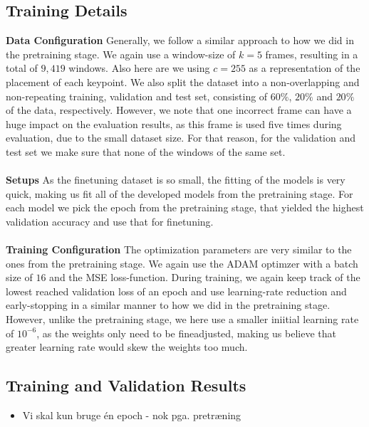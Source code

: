\documentclass[./main.tex]{subfiles}
\begin{document}
\subsection{Training Details}
\textbf{Data Configuration} Generally, we follow a similar approach to how we did in the pretraining stage. We again use a window-size of $k = 5$ frames, resulting in a total of $9,419$ windows. Also here are we using $c = 255$ as a representation of the placement of each keypoint. We also split the dataset into a non-overlapping and non-repeating training, validation and test set, consisting of $60\%$, $20\%$ and $20\%$ of the data, respectively. However, we note that one incorrect frame can have a huge impact on the evaluation results, as this frame is used five times during evaluation, due to the small dataset size. For that reason, for the validation and test set we make sure that none of the windows of the same set.
\\
\\
\textbf{Setups} As the finetuning dataset is so small, the fitting of the models is very quick, making us fit all of the developed models from the pretraining stage. For each model we pick the epoch from the pretraining stage, that yielded the highest validation accuracy and use that for finetuning.
\\
\\
\textbf{Training Configuration} The optimization parameters are very similar to the ones from the pretraining stage. We again use the ADAM optimzer with a batch size of $16$ and the MSE loss-function. During training, we again keep track of the lowest reached validation loss of an epoch and use learning-rate reduction and early-stopping in a similar manner to how we did in the pretraining stage. However, unlike the pretraining stage, we here use a smaller iniitial learning rate of $10^{-6}$, as the weights only need to be fineadjusted, making us believe that greater learning rate would skew the weights too much.

\subsection{Training and Validation Results}
\begin{itemize}
    \item Vi skal kun bruge én epoch - nok pga. pretræning
\end{itemize}
\end{document}
